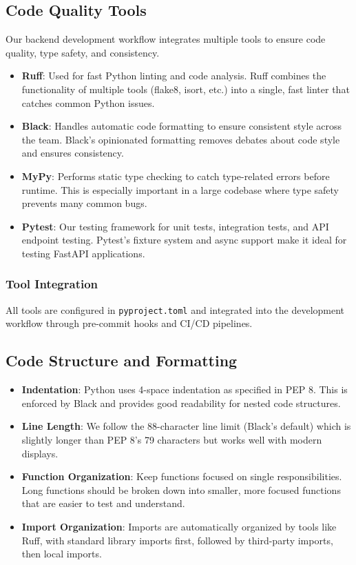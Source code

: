 \documentclass[12pt]{article}
\begin{document}
\subsection{Code Quality Tools}
Our backend development workflow integrates multiple tools to ensure code quality, type safety, and consistency.

\begin{itemize}
    \item \textbf{Ruff}: Used for fast Python linting and code analysis. Ruff combines the functionality of multiple tools (flake8, isort, etc.) into a single, fast linter that catches common Python issues.
    
    \item \textbf{Black}: Handles automatic code formatting to ensure consistent style across the team. Black's opinionated formatting removes debates about code style and ensures consistency.
    
    \item \textbf{MyPy}: Performs static type checking to catch type-related errors before runtime. This is especially important in a large codebase where type safety prevents many common bugs.
    
    \item \textbf{Pytest}: Our testing framework for unit tests, integration tests, and API endpoint testing. Pytest's fixture system and async support make it ideal for testing FastAPI applications.
\end{itemize}

\subsubsection{Tool Integration}
All tools are configured in \texttt{pyproject.toml} and integrated into the development workflow through pre-commit hooks and CI/CD pipelines.

\subsection{Code Structure and Formatting}

\begin{itemize}
    \item \textbf{Indentation}: Python uses 4-space indentation as specified in PEP 8. This is enforced by Black and provides good readability for nested code structures.
    
    \item \textbf{Line Length}: We follow the 88-character line limit (Black's default) which is slightly longer than PEP 8's 79 characters but works well with modern displays.
    
    \item \textbf{Function Organization}: Keep functions focused on single responsibilities. Long functions should be broken down into smaller, more focused functions that are easier to test and understand.
    
    \item \textbf{Import Organization}: Imports are automatically organized by tools like Ruff, with standard library imports first, followed by third-party imports, then local imports.
\end{itemize}
\end{document}
